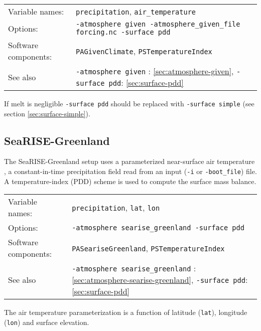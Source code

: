 \documentclass[titlepage,letterpaper,final]{scrartcl}
\begin{document}
\begin{center}
  \begin{tabular}{lp{}}
    \toprule
    Variable names: & \texttt{precipitation}, \texttt{air_temperature} \\
    Options: & \texttt{-atmosphere given -atmosphere_given_file forcing.nc -surface~pdd} \\
    Software components: & \texttt{PAGivenClimate}, \texttt{PSTemperatureIndex} \\
    See also & \texttt{-atmosphere given} : \ref{sec:atmosphere-given},
    \texttt{-surface pdd}: \ref{sec:surface-pdd} \\
    \bottomrule
  \end{tabular}
\end{center}

If melt is negligible \texttt{-surface pdd} should be replaced with \texttt{-surface simple} (see section \ref{sec:surface-simple}).

\subsection{SeaRISE-Greenland}
\label{sec:use-case-searise-greenland}

The SeaRISE-Greenland setup uses a parameterized near-surface air temperature \cite{Faustoetal2009}, a constant-in-time precipitation field read from an input (\texttt{-i} or \texttt{-boot_file}) file. A temperature-index (PDD) scheme is used to compute the surface mass balance.

\begin{center}
  \begin{tabular}{lp{}}
    \toprule
    Variable names: & \texttt{precipitation}, \texttt{lat}, \texttt{lon} \\
    Options: & \texttt{-atmosphere searise_greenland -surface~pdd} \\
    Software components: & \texttt{PASeariseGreenland}, \texttt{PSTemperatureIndex} \\
    See also & \texttt{-atmosphere searise_greenland} : \ref{sec:atmosphere-searise-greenland},
    \texttt{-surface pdd}: \ref{sec:surface-pdd} \\
    \bottomrule
  \end{tabular}
\end{center}

The air temperature parameterization is a function of latitude (\texttt{lat}), longitude (\texttt{lon}) and surface elevation.
\end{document}
